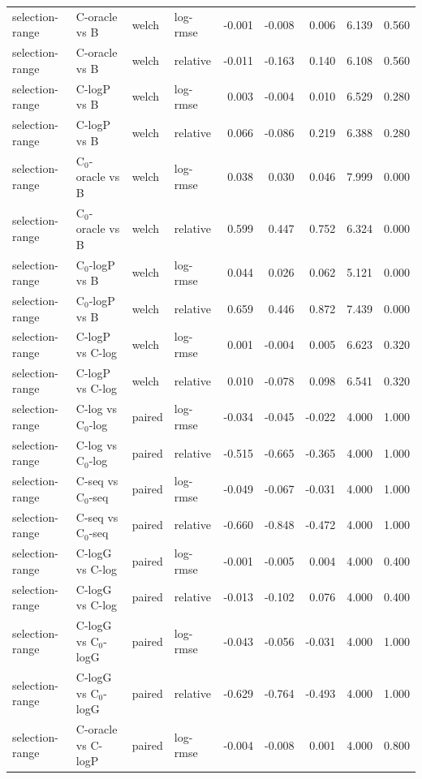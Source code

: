 \begin{longtable}{llllrrrrr}
selection-range & C-oracle vs B & welch & log-rmse & -0.001 & -0.008 & 0.006 & 6.139 & 0.560 \\
selection-range & C-oracle vs B & welch & relative & -0.011 & -0.163 & 0.140 & 6.108 & 0.560 \\
selection-range & C-logP vs B & welch & log-rmse & 0.003 & -0.004 & 0.010 & 6.529 & 0.280 \\
selection-range & C-logP vs B & welch & relative & 0.066 & -0.086 & 0.219 & 6.388 & 0.280 \\
selection-range & C$_0$-oracle vs B & welch & log-rmse & 0.038 & 0.030 & 0.046 & 7.999 & 0.000 \\
selection-range & C$_0$-oracle vs B & welch & relative & 0.599 & 0.447 & 0.752 & 6.324 & 0.000 \\
selection-range & C$_0$-logP vs B & welch & log-rmse & 0.044 & 0.026 & 0.062 & 5.121 & 0.000 \\
selection-range & C$_0$-logP vs B & welch & relative & 0.659 & 0.446 & 0.872 & 7.439 & 0.000 \\
selection-range & C-logP vs C-log & welch & log-rmse & 0.001 & -0.004 & 0.005 & 6.623 & 0.320 \\
selection-range & C-logP vs C-log & welch & relative & 0.010 & -0.078 & 0.098 & 6.541 & 0.320 \\
selection-range & C-log vs C$_0$-log & paired & log-rmse & -0.034 & -0.045 & -0.022 & 4.000 & 1.000 \\
selection-range & C-log vs C$_0$-log & paired & relative & -0.515 & -0.665 & -0.365 & 4.000 & 1.000 \\
selection-range & C-seq vs C$_0$-seq & paired & log-rmse & -0.049 & -0.067 & -0.031 & 4.000 & 1.000 \\
selection-range & C-seq vs C$_0$-seq & paired & relative & -0.660 & -0.848 & -0.472 & 4.000 & 1.000 \\
selection-range & C-logG vs C-log & paired & log-rmse & -0.001 & -0.005 & 0.004 & 4.000 & 0.400 \\
selection-range & C-logG vs C-log & paired & relative & -0.013 & -0.102 & 0.076 & 4.000 & 0.400 \\
selection-range & C-logG vs C$_0$-logG & paired & log-rmse & -0.043 & -0.056 & -0.031 & 4.000 & 1.000 \\
selection-range & C-logG vs C$_0$-logG & paired & relative & -0.629 & -0.764 & -0.493 & 4.000 & 1.000 \\
selection-range & C-oracle vs C-logP & paired & log-rmse & -0.004 & -0.008 & 0.001 & 4.000 & 0.800 \\

\end{longtable}
